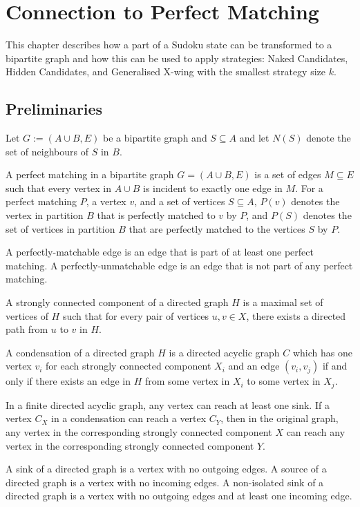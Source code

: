 \chapter{Connection to Perfect Matching}\label{chap:5}

This chapter describes how a part of a Sudoku state can be transformed to a bipartite graph and how this can be used to
apply strategies: Naked Candidates, Hidden Candidates, and Generalised X-wing with the smallest strategy size $k$.

\section{Preliminaries}

Let $G := (A \cup B, E)$ be a bipartite graph and $S \subseteq A$
and let $N(S)$ denote the set of neighbours of $S$ in $B$.

A perfect matching in a bipartite graph $G = (A \cup B, E)$ is a set of edges
$M \subseteq E$ such that every vertex in $A \cup B$ is incident to exactly one edge in $M$.
For a perfect matching $P$, a vertex $v$, and a set of vertices $S \subseteq A$,
$P(v)$ denotes the vertex in partition $B$ that is perfectly matched to $v$ by $P$, and
$P(S)$ denotes the set of vertices in partition $B$ that are perfectly matched to the vertices $S$ by $P$.

A perfectly-matchable edge is an edge that is part of at least one perfect matching.
A perfectly-unmatchable edge is an edge that is not part of any perfect matching.

A strongly connected component of a directed graph $H$ is a maximal set of vertices
of $H$ such that for every pair of vertices $u, v \in X$,
there exists a directed path from $u$ to $v$ in $H$.

A condensation of a directed graph $H$ is a directed acyclic graph $C$
which has one vertex $v_i$ for each strongly connected component $X_i$ and
an edge $(v_i, v_j)$ if and only if
there exists an edge in $H$ from some vertex in $X_i$ to some vertex in $X_j$.

In a finite directed acyclic graph, any vertex can reach at least one sink.
If a vertex $C_X$ in a condensation can reach a vertex $C_Y$, then in the original graph,
any vertex in the corresponding strongly connected component $X$
can reach any vertex in the corresponding strongly connected component $Y$.

A sink of a directed graph is a vertex with no outgoing edges.
A source of a directed graph is a vertex with no incoming edges.
A non-isolated sink of a directed graph is a vertex with no outgoing edges and at least one incoming edge.

